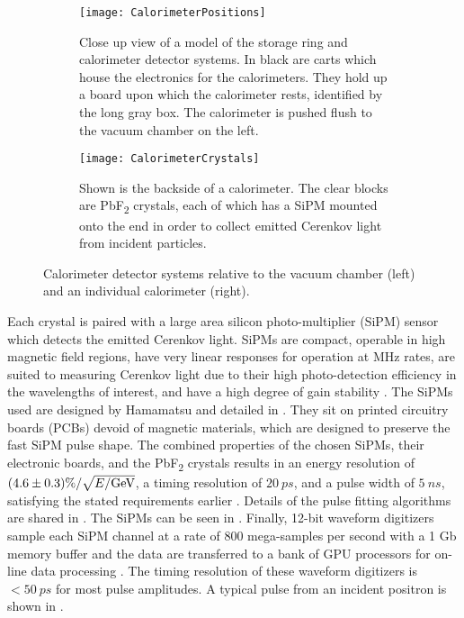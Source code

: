 \begin{figure}
\centering
    \begin{subfigure}[t]{0.43\textwidth}
        \centering
        \texttt{[image: CalorimeterPositions]}
        \caption{Close up view of a model of the storage ring and calorimeter detector systems. In black are carts which house the electronics for the calorimeters. They hold up a board upon which the calorimeter rests, identified by the long gray box. The calorimeter is pushed flush to the vacuum chamber on the left.}
    \label{fig:CalorimeterPositions}
    \end{subfigure}%
    \hspace{5mm}
    \begin{subfigure}[t]{0.47\textwidth}
        \centering
        \texttt{[image: CalorimeterCrystals]}
        \caption{Shown is the backside of a calorimeter. The clear blocks are PbF\textsubscript{2} crystals, each of which has a SiPM mounted onto the end in order to collect emitted Cerenkov light from incident particles.}
    \label{fig:CalorimeterCrystals}
    \end{subfigure}
\caption[Calorimeters]{Calorimeter detector systems relative to the vacuum chamber (left) and an individual calorimeter (right).}
\label{fig:calos}
\end{figure}



Each crystal is paired with a large area silicon photo-multiplier (SiPM) sensor which detects the emitted Cerenkov light. SiPMs are compact, operable in high magnetic field regions, have very linear responses for operation at MHz rates, are suited to measuring Cerenkov light due to their high photo-detection efficiency in the wavelengths of interest, and have a high degree of gain stability \cite{Kaspar:2016ofv}. The SiPMs used are designed by Hamamatsu and detailed in . They sit on printed circuitry boards (PCBs) devoid of magnetic materials, which are designed to preserve the fast SiPM pulse shape. The combined properties of the chosen SiPMs, their electronic boards, and the PbF\textsubscript{2} crystals results in an energy resolution of $(4.6 \pm 0.3) \% / \sqrt{E/\text{G\text{e\kern-0.15ex V}}}$, a timing resolution of $\SI{20}{ps}$, and a pulse width of $\SI{5}{ns}$, satisfying the stated requirements earlier \cite{Fienberg:2014kka,Kaspar:2016ofv}. Details of the pulse fitting algorithms are shared in . The SiPMs can be seen in . Finally, 12-bit waveform digitizers sample each SiPM channel at a rate of 800 mega-samples per second with a 1 Gb memory buffer and the data are transferred to a bank of GPU processors for on-line data processing \cite{Sweigart:2016jty}. The timing resolution of these waveform digitizers is $<\SI{50}{ps}$ for most pulse amplitudes. A typical pulse from an incident positron is shown in .

